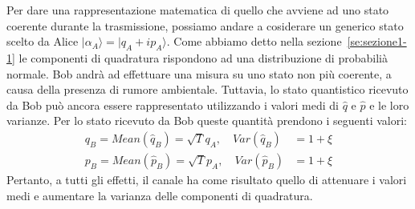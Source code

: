 Per dare una rappresentazione matematica di quello che avviene ad uno stato coerente durante la trasmissione, possiamo andare a cosiderare un generico stato scelto da Alice $|\alpha_A \rangle = | q_A + i p_A\rangle$. Come abbiamo detto nella sezione~\ref{se:sezione1-1} le componenti di quadratura rispondono ad una distribuzione di probabili\`a normale. %
Bob andrà ad effettuare una misura su uno stato non più coerente, a causa della presenza di rumore ambientale. Tuttavia, lo stato quantistico ricevuto da Bob può ancora essere rappresentato utilizzando i valori medi di $\hat q$ e $\hat p$ e le loro varianze. Per lo stato ricevuto da Bob queste quantità prendono i seguenti valori:
\begin{equation}\label{eq:stato-bob}
\begin{split}
q_B = Mean(\hat{q}_B) = \sqrt{T} q_A, \quad Var(\hat{q}_B) &= 1 + \xi \\
p_B = Mean(\hat{p}_B) = \sqrt{T} p_A, \quad Var(\hat{p}_B) &= 1 + \xi 
\end{split}
\end{equation}
Pertanto, a tutti gli effetti, il canale ha come risultato quello di attenuare i valori medi e aumentare la varianza delle componenti di quadratura. 

